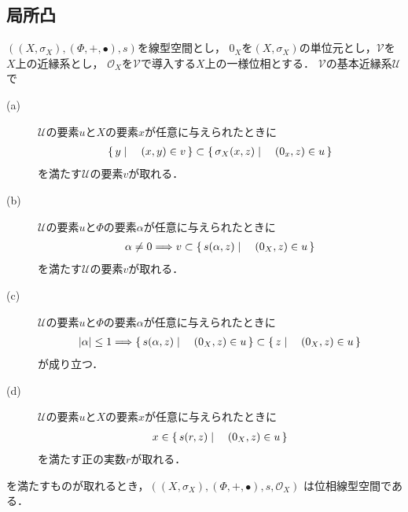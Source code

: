 \subsection{局所凸}
	\begin{screen}
		\begin{thm}[線型位相を導入する近縁系]
		\label{thm:entourages_introducing_vector_topology}
			$\left(\left(X,\sigma_X\right),(\Phi,+,\bullet),s\right)$を線型空間とし，
			$0_X$を$\left(X,\sigma_X\right)$の単位元とし，$\mathscr{V}$を$X$上の近縁系とし，
			$\mathscr{O}_X$を$\mathscr{V}$で導入する$X$上の一様位相とする．
			$\mathscr{V}$の基本近縁系$\mathscr{U}$で
			\begin{description}
				\item[(a)] $\mathscr{U}$の要素$u$と$X$の要素$x$が任意に与えられたときに
					\begin{align}
						\left\{\, y \mid \quad (x,y) \in v\, \right\} \subset \left\{\, \sigma_X(x,z) \mid \quad (0_x,z) \in u\, \right\}
					\end{align}
					を満たす$\mathscr{U}$の要素$v$が取れる．
					
				\item[(b)] $\mathscr{U}$の要素$u$と$\Phi$の要素$\alpha$が任意に与えられたときに
					\begin{align}
						\alpha \neq 0 \Longrightarrow v \subset \left\{\, s(\alpha,z) \mid \quad (0_X,z) \in u\, \right\}
					\end{align}
					を満たす$\mathscr{U}$の要素$v$が取れる．
					
				\item[(c)] $\mathscr{U}$の要素$u$と$\Phi$の要素$\alpha$が任意に与えられたときに
					\begin{align}
						|\alpha| \leq 1 \Longrightarrow \left\{\, s(\alpha,z) \mid \quad (0_X,z) \in u\, \right\} \subset \left\{\, z \mid \quad (0_X,z) \in u\, \right\}
					\end{align}
					が成り立つ．
					
				\item[(d)] $\mathscr{U}$の要素$u$と$X$の要素$x$が任意に与えられたときに
					\begin{align}
						x \in \left\{\, s(r,z) \mid \quad (0_X,z) \in u\, \right\}
					\end{align}
					を満たす正の実数$r$が取れる．
			\end{description}
			を満たすものが取れるとき，$\left(\left(X,\sigma_X\right),(\Phi,+,\bullet),s,\mathscr{O}_X\right)$
			は位相線型空間である．
		\end{thm}
	\end{screen}
	

